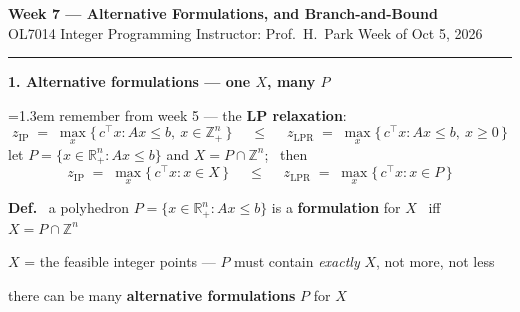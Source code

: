 \documentclass[10pt]{article}
\newcommand{\beat}[2]{%
  \par\medskip\needspace{8\baselineskip}%
  {\color{ruleink}\rule{\textwidth}{1pt}}\par\nobreak\vspace{2pt}
  {\large\bfseries #1.\; #2}\par\nobreak\vspace{3pt}}
\newenvironment{board}{%
  \par\vspace{2pt}
  \begingroup\leftskip=1.3em\relax}{%
  \par\endgroup\vspace{2pt}}
\begin{document}
{\Large\bfseries Week 7 --- Alternative Formulations, and Branch-and-Bound}\\[2pt]
{\small OL7014 Integer Programming \quad\textbullet\quad Instructor: Prof.\ H.\ Park \quad\textbullet\quad Week of Oct 5, 2026}

\beat{1}{Alternative formulations --- one $X$, many $P$}
\begin{board}
remember from week 5 --- the \textbf{LP relaxation}:
\[
  z_{\mathrm{IP}} \;=\; \max_{x} \{\, c^{\top}x : Ax \le b, \ x \in \mathbb{Z}^n_{+} \,\}
  \quad\;\le\;\quad
  z_{\mathrm{LPR}} \;=\; \max_{x} \{\, c^{\top}x : Ax \le b, \ x \ge 0 \,\}
\]
let $P = \{x \in \mathbb{R}^n_{+} : Ax \le b\}$ and $X = P \cap \mathbb{Z}^n$; \ then
\[
  z_{\mathrm{IP}} \;=\; \max_{x} \{\, c^{\top}x : x \in X \,\}
  \quad\;\le\;\quad
  z_{\mathrm{LPR}} \;=\; \max_{x} \{\, c^{\top}x : x \in P \,\}
\]

\textbf{Def.} \ a polyhedron $P = \{x \in \mathbb{R}^n_{+} : Ax \le b\}$ is a \textbf{formulation} for $X$ \ iff \ $X = P \cap \mathbb{Z}^n$
\vspace{1pt}

\quad $X$ = the feasible integer points --- $P$ must contain \emph{exactly} $X$, not more, not less
\vspace{3pt}

there can be many \textbf{alternative formulations} $P$ for $X$
\vspace{2pt}


\end{board}
\end{document}
